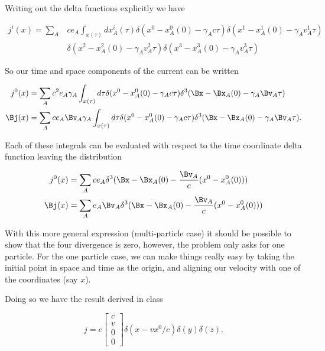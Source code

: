 {Writing out the delta functions explicitly we have

\begin{equation}\label{eqn:relElectroDynProblemSet3:1980}
\begin{aligned}
j^i(x) = \sum_A &c e_A \int_{x(\tau)} dx_A^i(\tau) 
\delta(x^0 - x_A^0(0) - \gamma_A c \tau) 
\delta(x^1 - x_A^1(0) - \gamma_A v_A^1 \tau) \\
&\delta(x^2 - x_A^2(0) - \gamma_A v_A^2 \tau) 
\delta(x^3 - x_A^3(0) - \gamma_A v_A^3 \tau)
\end{aligned}
\end{equation}

So our time and space components of the current can be written

\begin{equation}\label{eqn:relElectroDynProblemSet3:2000}
\begin{aligned}
j^0(x) &= \sum_A c^2 e_A \gamma_A \int_{x(\tau)} d\tau
\delta(x^0 - x_A^0(0) - \gamma_A c \tau)
\delta^3(\Bx - \Bx_A(0) - \gamma_A \Bv_A \tau) \\
\Bj(x) &= \sum_A c e_A \Bv_A \gamma_A \int_{x(\tau)} d\tau
\delta(x^0 - x_A^0(0) - \gamma_A c \tau)
\delta^3(\Bx - \Bx_A(0) - \gamma_A \Bv_A \tau).
\end{aligned}
\end{equation}

Each of these integrals can be evaluated with respect to the time coordinate delta function leaving the distribution

\begin{equation}\label{eqn:relElectroDynProblemSet3:2020}
\begin{aligned}
j^0(x) &= \sum_A c e_A 
\delta^3(\Bx - \Bx_A(0) - \frac{\Bv_A}{c} (x^0 - x_A^0(0))) \\
\Bj(x) &= \sum_A e_A \Bv_A 
\delta^3(\Bx - \Bx_A(0) - \frac{\Bv_A}{c} (x^0 - x_A^0(0)))
\end{aligned}
\end{equation}

With this more general expression (multi-particle case) it should be possible to show that the four divergence is zero, however, the problem only asks for one particle.  For the one particle case, we can make things really easy by taking the initial point in space and time as the origin, and aligning our velocity with one of the coordinates (say $x$).

Doing so we have the result derived in class

\begin{equation}\label{eqn:relElectroDynProblemSet3:2040}
j = e 
\begin{bmatrix}
c \\
v \\
0 \\
0 
\end{bmatrix}
\delta(x - v x^0/c)
\delta(y)
\delta(z).
\end{equation}

}
